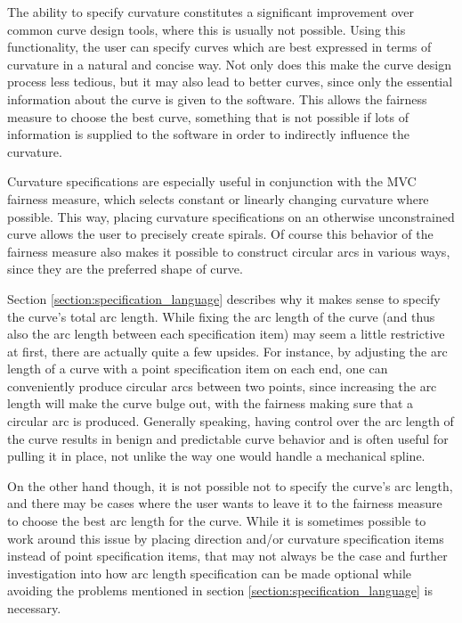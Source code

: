 \documentclass[a4paper]{article}
\begin{document}
				The ability to specify curvature constitutes a significant improvement over common curve design tools, where this is usually not possible. Using this functionality, the user can specify curves which are best expressed in terms of curvature in a natural and concise way. Not only does this make the curve design process less tedious, but it may also lead to better curves, since only the essential information about the curve is given to the software. This allows the fairness measure to choose the best curve, something that is not possible if lots of information is supplied to the software in order to indirectly influence the curvature.

				Curvature specifications are especially useful in conjunction with the MVC fairness measure, which selects constant or linearly changing curvature where possible. This way, placing curvature specifications on an otherwise unconstrained curve allows the user to precisely create spirals. Of course this behavior of the fairness measure also makes it possible to construct circular arcs in various ways, since they are the preferred shape of curve.

				Section \ref{section:specification_language} describes why it makes sense to specify the curve's total arc length. While fixing the arc length of the curve (and thus also the arc length between each specification item) may seem a little restrictive at first, there are actually quite a few upsides. For instance, by adjusting the arc length of a curve with a point specification item on each end, one can conveniently produce circular arcs between two points, since increasing the arc length will make the curve bulge out, with the fairness making sure that a circular arc is produced. Generally speaking, having control over the arc length of the curve results in benign and predictable curve behavior and is often useful for pulling it in place, not unlike the way one would handle a mechanical spline.

				On the other hand though, it is not possible not to specify the curve's arc length, and there may be cases where the user wants to leave it to the fairness measure to choose the best arc length for the curve. While it is sometimes possible to work around this issue by placing direction and/or curvature specification items instead of point specification items, that may not always be the case and further investigation into how arc length specification can be made optional while avoiding the problems mentioned in section \ref{section:specification_language} is necessary.
\end{document}
